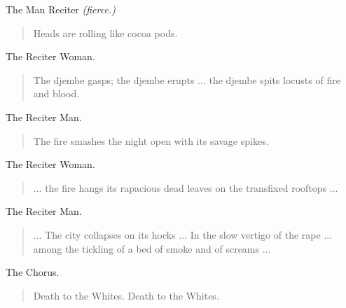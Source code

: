 \documentclass[letterpaper,article,12pt,oneside,notitlepage]{memoir}
\begin{document}
\begin{center}The Man Reciter \textit{(fierce.)}\end{center}

\begin{verse}
\hspace{1cm} Heads are rolling like cocoa pods. \\
\end{verse}

\begin{center}The Reciter Woman.\end{center}

\begin{verse}
\indent The djembe gasps; the djembe erupts ... the djembe spits locusts of fire and blood. \\
\end{verse}

\begin{center}The Reciter Man.\end{center}

\begin{verse}
\hspace{1cm} The fire smashes the night open with its savage spikes. \\
\end{verse}

\begin{center}The Reciter Woman.\end{center}

\begin{verse}
\indent ... the fire hangs its rapacious dead leaves on the transfixed rooftops ... \\
\end{verse}

\clearpage

\begin{center}The Reciter Man.\end{center}

\begin{verse}
\indent ... The city collapses on its hocks ... In the slow vertigo of the rape ... among the tickling of a bed of smoke and of screams ... \\
\end{verse}

\begin{center}The Chorus.\end{center}

\begin{verse}
\hspace{1cm} Death to the Whites. Death to the Whites. \\
\end{verse}
\end{document}
